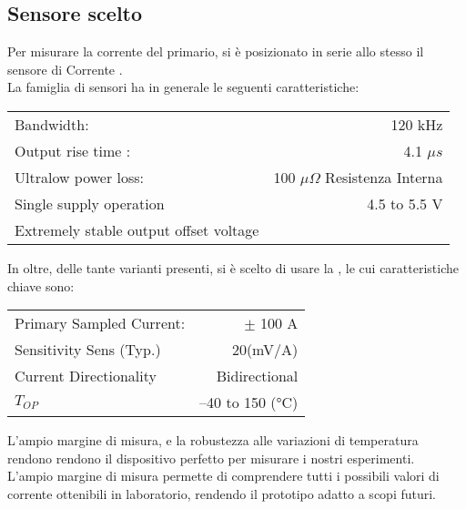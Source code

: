 \subsection{Sensore scelto}
Per misurare la corrente del primario, si è posizionato in serie allo stesso il sensore di Corrente \cite{ACS770}.\\
La famiglia di sensori ha in generale le seguenti caratteristiche: \vspace{-5mm}
\begin{center}
	\begin{tabular}[t]{|l r|}
		\hline
		Bandwidth:                             & 120 kHz                               \\
		Output rise time :                     & 4.1 $ \mu s $                         \\
		Ultralow power loss:                   & 100 $ \mu \Omega $ Resistenza Interna \\
		Single supply operation                & 4.5 to 5.5 V                          \\
		Extremely stable output offset voltage &                                       \\
		\hline
	\end{tabular}
\end{center}

\noindent
In oltre, delle tante varianti presenti, si è scelto di usare la , le cui caratteristiche chiave sono:

\begin{center}
	\begin{tabular}[t]{|l r|}
		\hline
		Primary Sampled Current: & $\pm$ 100 A     \\
		Sensitivity Sens (Typ.)  & 20(mV/A)        \\
		Current Directionality   & Bidirectional   \\
		$T_{OP}$                 & –40 to 150 (°C) \\
		\hline
	\end{tabular}
\end{center}

\noindent
L'ampio margine di misura, e la robustezza alle variazioni di temperatura rendono rendono il dispositivo perfetto per misurare i nostri esperimenti.\\
L'ampio margine di misura permette di comprendere tutti i possibili valori di corrente ottenibili in laboratorio, rendendo il prototipo adatto a scopi futuri.\\
\vspace{-8mm}

